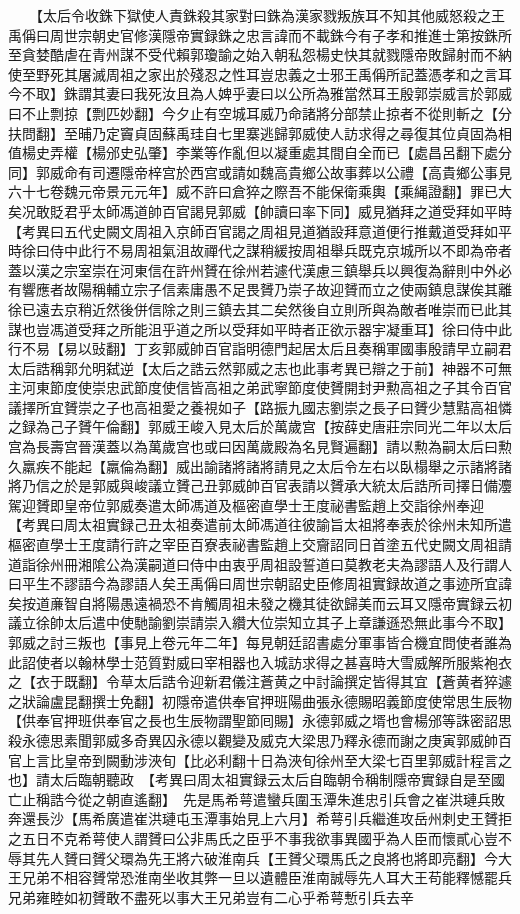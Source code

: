 　　【太后令收銖下獄使人責銖殺其家對曰銖為漢家戮叛族耳不知其他威怒殺之王禹偁曰周世宗朝史官修漢隱帝實録銖之忠言諱而不載銖今有子孝和推進士第按銖所至貪婪酷虐在青州謀不受代賴郭瓊諭之始入朝私怨楊史快其就戮隱帝敗歸射而不納使至野死其屠滅周祖之家出於殘忍之性耳豈忠義之士邪王禹偁所記蓋憑孝和之言耳今不取】銖謂其妻曰我死汝且為人婢乎妻曰以公所為雅當然耳王殷郭崇威言於郭威曰不止剽掠【剽匹妙翻】今夕止有空城耳威乃命諸將分部禁止掠者不從則斬之【分扶問翻】至晡乃定竇貞固蘇禹珪自七里寨逃歸郭威使人訪求得之尋復其位貞固為相值楊史弄權【楊邠史弘肇】李業等作亂但以凝重處其間自全而已【處昌呂翻下處分同】郭威命有司遷隱帝梓宫於西宫或請如魏高貴鄉公故事葬以公禮【高貴鄉公事見六十七卷魏元帝景元元年】威不許曰倉猝之際吾不能保衛乘輿【乘䋲證翻】罪已大矣况敢貶君乎太師馮道帥百官謁見郭威【帥讀曰率下同】威見猶拜之道受拜如平時　【考異曰五代史闕文周祖入京師百官謁之周祖見道猶設拜意道便行推戴道受拜如平時徐曰侍中此行不易周祖氣沮故禪代之謀稍緩按周祖舉兵既克京城所以不即為帝者蓋以漢之宗室崇在河東信在許州贇在徐州若遽代漢慮三鎮舉兵以興復為辭則中外必有響應者故陽稱輔立宗子信素庸愚不足畏贇乃崇子故迎贇而立之使兩鎮息謀俟其離徐已遠去京稍近然後併信除之則三鎮去其二矣然後自立則所與為敵者唯崇而已此其謀也豈馮道受拜之所能沮乎道之所以受拜如平時者正欲示器宇凝重耳】徐曰侍中此行不易【易以䜴翻】丁亥郭威帥百官詣明德門起居太后且奏稱軍國事殷請早立嗣君太后誥稱郭允明弑逆【太后之誥云然郭威之志也此事考異已辯之于前】神器不可無主河東節度使崇忠武節度使信皆高祖之弟武寧節度使贇開封尹勲高祖之子其令百官議擇所宜贇崇之子也高祖愛之養視如子【路振九國志劉崇之長子曰贇少慧黠高祖憐之録為己子贇午倫翻】郭威王峻入見太后於萬歲宫【按薛史唐莊宗同光二年以太后宫為長壽宫晉漢蓋以為萬歲宫也或曰因萬歲殿為名見賢遍翻】請以勲為嗣太后曰勲久羸疾不能起【羸倫為翻】威出諭諸將諸將請見之太后令左右以臥榻舉之示諸將諸將乃信之於是郭威與峻議立贇己丑郭威帥百官表請以贇承大統太后誥所司擇日備灋駕迎贇即皇帝位郭威奏遣太師馮道及樞密直學士王度祕書監趙上交詣徐州奉迎　【考異曰周太祖實録己丑太祖奏遣前太師馮道往彼諭旨太祖將奉表於徐州未知所遣樞密直學士王度請行許之宰臣百寮表祕書監趙上交齎詔同日首塗五代史闕文周祖請道詣徐州冊湘隂公為漢嗣道曰侍中由衷乎周祖設誓道曰莫教老夫為謬語人及行謂人曰平生不謬語今為謬語人矣王禹偁曰周世宗朝詔史臣修周祖實録故道之事迹所宜諱矣按道亷智自將陽愚遠禍恐不肯觸周祖未發之機其徒欲歸美而云耳又隱帝實録云初議立徐帥太后遣中使馳諭劉崇請崇入纘大位崇知立其子上章謙遜恐無此事今不取】郭威之討三叛也【事見上卷元年二年】每見朝廷詔書處分軍事皆合機宜問使者誰為此詔使者以翰林學士范質對威曰宰相器也入城訪求得之甚喜時大雪威解所服紫袍衣之【衣于既翻】令草太后誥令迎新君儀注蒼黄之中討論撰定皆得其宜【蒼黄者猝遽之狀論盧昆翻撰士免翻】初隱帝遣供奉官押班陽曲張永德賜昭義節度使常思生辰物【供奉官押班供奉官之長也生辰物謂聖節囘賜】永德郭威之壻也會楊邠等誅密詔思殺永德思素聞郭威多奇異囚永德以觀變及威克大梁思乃釋永德而謝之庚寅郭威帥百官上言比皇帝到闕動涉浹旬【比必利翻十日為浹旬徐州至大梁七百里郭威計程言之也】請太后臨朝聽政　【考異曰周太祖實録云太后自臨朝令稱制隱帝實録自是至國亡止稱誥今從之朝直遙翻】　先是馬希萼遣蠻兵圍玉潭朱進忠引兵會之崔洪璉兵敗奔還長沙【馬希廣遣崔洪璉屯玉潭事始見上六月】希萼引兵繼進攻岳州刺史王贇拒之五日不克希萼使人謂贇曰公非馬氏之臣乎不事我欲事異國乎為人臣而懷貳心豈不辱其先人贇曰贇父環為先王將六破淮南兵【王贇父環馬氏之良將也將即亮翻】今大王兄弟不相容贇常恐淮南坐收其弊一旦以遺體臣淮南誠辱先人耳大王苟能釋憾罷兵兄弟雍睦如初贇敢不盡死以事大王兄弟豈有二心乎希萼慙引兵去辛